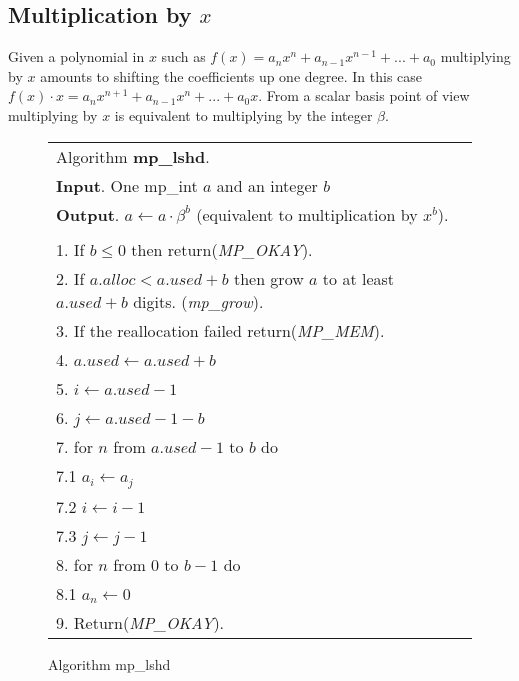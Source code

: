 \documentclass[b5paper]{book}
\begin{document}
\subsection{Multiplication by $x$}

Given a polynomial in $x$ such as $f(x) = a_n x^n + a_{n-1} x^{n-1} + ... + a_0$ multiplying by $x$ amounts to shifting the coefficients up one 
degree.  In this case $f(x) \cdot x = a_n x^{n+1} + a_{n-1} x^n + ... + a_0 x$.  From a scalar basis point of view multiplying by $x$ is equivalent to
multiplying by the integer $\beta$.  

\newpage\begin{figure}[!here]
\begin{small}
\begin{center}
\begin{tabular}{l}
\hline Algorithm \textbf{mp\_lshd}. \\
\textbf{Input}.   One mp\_int $a$ and an integer $b$ \\
\textbf{Output}.  $a \leftarrow a \cdot \beta^b$ (equivalent to multiplication by $x^b$). \\
\hline \\
1.  If $b \le 0$ then return(\textit{MP\_OKAY}). \\
2.  If $a.alloc < a.used + b$ then grow $a$ to at least $a.used + b$ digits.  (\textit{mp\_grow}). \\
3.  If the reallocation failed return(\textit{MP\_MEM}). \\
4.  $a.used \leftarrow a.used + b$ \\
5.  $i \leftarrow a.used - 1$ \\
6.  $j \leftarrow a.used - 1 - b$ \\
7.  for $n$ from $a.used - 1$ to $b$ do \\
\hspace{3mm}7.1  $a_{i} \leftarrow a_{j}$ \\
\hspace{3mm}7.2  $i \leftarrow i - 1$ \\
\hspace{3mm}7.3  $j \leftarrow j - 1$ \\
8.  for $n$ from 0 to $b - 1$ do \\
\hspace{3mm}8.1  $a_n \leftarrow 0$ \\
9.  Return(\textit{MP\_OKAY}). \\
\hline
\end{tabular}
\end{center}
\end{small}
\caption{Algorithm mp\_lshd}
\end{figure}
\end{document}
